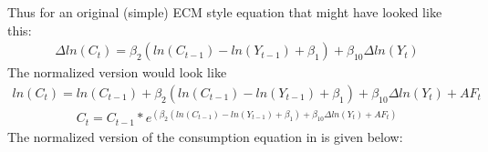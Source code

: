 \documentclass[letterpaper,10pt,english]{jupyterBook}
\begin{document}
\sphinxAtStartPar
Thus for an original (simple) ECM style equation that might have looked like this:
\begin{equation*}
\begin{split}\Delta ln(C_t) = \beta_2 (ln(C_{t-1})-ln(Y_{t-1}) + \beta_1) + \beta_{10}\Delta ln(Y_t)\end{split}
\end{equation*}
\sphinxAtStartPar
The normalized version would look like
\begin{equation*}
\begin{split} ln(C_t) =ln(C_{t-1})+\beta_2 (ln(C_{t-1})-ln(Y_{t-1}) + \beta_1) + \beta_{10}\Delta ln(Y_t) +AF_t\end{split}
\end{equation*}\begin{equation*}
\begin{split} C_t= C_{t-1} * e^{(\beta_2 (ln(C_{t-1})-ln(Y_{t-1}) + \beta_1) + \beta_{10}\Delta ln(Y_t) +AF_t)}\end{split}
\end{equation*}
\sphinxAtStartPar
The normalized version of the consumption equation in  is given below:
\end{document}
